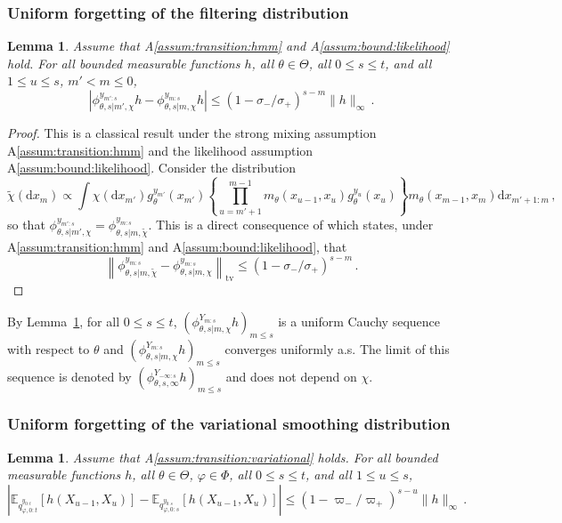 \documentclass{article}
\newtheorem{lemma}[theorem]{Lemma}
\newcommand{\1}{\mathbbm{1}}
\newcommand{\rmd}{\ensuremath{\mathrm{d}}}
\begin{document}
\subsubsection*{Uniform forgetting of the filtering distribution}

\begin{lemma}
\label{lem:forgetting:filter}
Assume that A\ref{assum:transition:hmm} and A\ref{assum:bound:likelihood} hold. For all bounded measurable functions  $h$, all $\theta\in\Theta$, all $0\leq s\leq t$, and all $1\leq u\leq s$, $m'<m\leq 0$,
$$
\left| \phi^{y_{m':s}}_{\theta,s|m',\chi}h - \phi^{y_{m:s}}_{\theta,s|m,\chi}h\right|\leq \left(1-\sigma_-/\sigma_+\right)^{s-m}\|h\|_\infty\,.
$$
\end{lemma}
\begin{proof}
This is a classical result under the strong mixing assumption A\ref{assum:transition:hmm} and the likelihood assumption A\ref{assum:bound:likelihood}. Consider the distribution
$$
\tilde \chi (\rmd x_m) \propto  \int \chi(\rmd x_{m'})g_\theta^{y_{m'}}(x_{m'})\left\{\prod_{u=m'+1}^{m-1} m_\theta(x_{u-1},x_u)g_\theta^{y_u}(x_u)\right\}m_\theta(x_{m-1},x_m)\rmd x_{m'+1:m}\,,
$$
so that $\phi^{y_{m':s}}_{\theta,s|m',\chi} = \phi^{y_{m:s}}_{\theta,s|m,\tilde\chi}$.
This is a direct consequence of \cite[Corollary 1]{douc2004asymptotic} which states, under A\ref{assum:transition:hmm} and A\ref{assum:bound:likelihood},  that 
$$
\left\|\phi^{y_{m:s}}_{\theta,s|m,\tilde\chi}-\phi^{y_{m:s}}_{\theta,s|m,\chi}\right\|_{\mathrm{tv}}\leq \left(1-\sigma_-/\sigma_+\right)^{s-m}\,.
$$
\end{proof}
By Lemma~\ref{lem:forgetting:filter}, for all $0\leq s\leq t$, $(\phi^{Y_{m:s}}_{\theta,s|m,\chi}h)_{m\leq s}$ is a uniform Cauchy sequence with respect to $\theta$ and $(\phi^{Y_{m:s}}_{\theta,s|m,\chi}h)_{m\leq s}$ converges uniformly a.s. The limit of this sequence is denoted by $(\phi^{Y_{-\infty:s}}_{\theta,s,\infty}h)_{m\leq s}$ and does not depend on $\chi$.


\subsubsection*{Uniform forgetting of the variational smoothing distribution}
\begin{lemma}
\label{lem:forgetting:elbo}
Assume that A\ref{assum:transition:variational} holds. For all bounded measurable functions  $h$, all $\theta\in\Theta$, $\varphi\in\Phi$, all $0\leq s\leq t$, and all $1\leq u\leq s$, 
$$
\left| \mathbb{E}_{q^{y_{0:t}}_{\varphi,0:t}}\left[h(X_{u-1},X_u)\right] - \mathbb{E}_{q^{y_{0:s}}_{\varphi,0:s}}\left[h(X_{u-1},X_u)\right]\right|\leq \left(1-\varpi_-/\varpi_+\right)^{s-u}\|h\|_\infty\,.
$$
\end{lemma}
\end{document}

